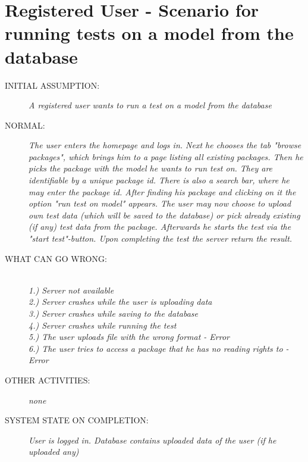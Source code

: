 \section{Registered User - Scenario for running tests on a model from the database}
\begin{description}
  \item [INITIAL ASSUMPTION:]
    \textit{A registered user wants to run a test on a model from the database}
  \item [NORMAL:]
    \textit{The user enters the homepage and logs in. Next he chooses the tab "browse packages", which brings him to a page listing all existing packages. Then he picks the package with the model he wants to run test on. They are identifiable by a unique package id. There is also a search bar, where he may enter the package id. After finding his package and clicking on it the option "run test on model" appears. The user may now choose to upload own test data (which will be saved to the database) or pick already existing (if any) test data from the package. Afterwards he starts the test via the "start test"-button. Upon completing the test the server return the result.}
  \item [WHAT CAN GO WRONG:]
    \textit{\\1.) Server not available \\2.) Server crashes while the user is uploading data \\3.) Server crashes while saving to the database \\4.) Server crashes while running the test \\5.) The user uploads file with the wrong format - Error \\6.) The user tries to access a package that he has no reading rights to - Error
}
  \item [OTHER ACTIVITIES:]
    \textit{none}
  \item [SYSTEM STATE ON COMPLETION:]
    \textit{User is logged in. Database contains uploaded data of the user (if he uploaded any)}
\end{description}

